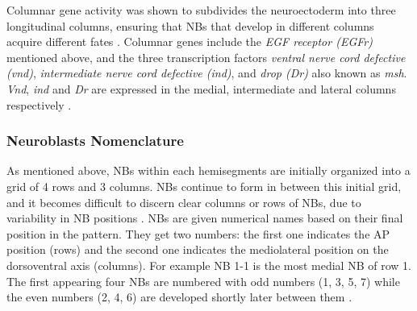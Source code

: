 Columnar gene activity was shown to subdivides the neuroectoderm into three longitudinal columns, 
ensuring that NBs that develop in different columns acquire different fates \cite{Skeath1999}. 
Columnar genes include the \textit{EGF receptor (EGFr)} mentioned above, and the three transcription 
factors \textit{ventral nerve cord defective (vnd)}, \textit{intermediate nerve cord defective (ind)}, 
and \textit{drop (Dr)} also known as \textit{msh}. \textit{Vnd}, \textit{ind} and \textit{Dr} are expressed in the medial, 
intermediate and lateral columns respectively \cite{mellerick1995dorsal,jimenez1995vnd,d1996msh,weiss1998dorsoventral, Skeath1999,Skeath2003}. 

\subsubsection{Neuroblasts Nomenclature}
As mentioned above, NBs within each hemisegments are initially organized into a grid of 4 rows and 3 columns. 
NBs continue to form in between this initial grid, and it becomes difficult to discern clear columns or rows of NBs, 
due to variability in NB positions \cite{doe1992molecular}. 
NBs are given numerical names based on their final position in the pattern. 
They get two numbers: the first one indicates the AP position (rows) and the second one indicates the mediolateral 
position on the dorsoventral axis (columns). For example NB 1-1 is the most medial NB of row 1. 
The first appearing four NBs are numbered with odd numbers (1, 3, 5, 7) while the even numbers (2, 4, 6) are developed 
shortly later between them \cite{Skeath1999}.  




